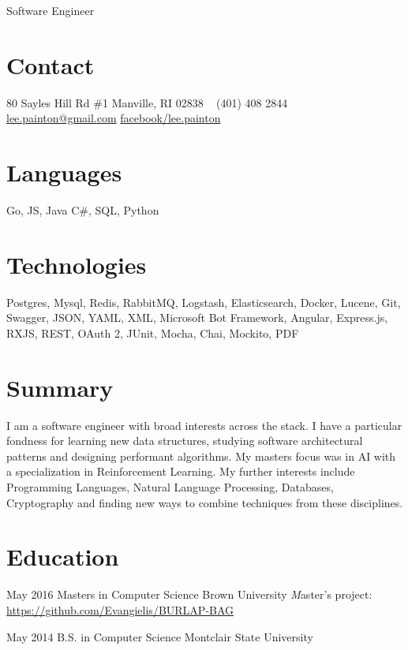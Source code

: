 \documentclass[]{friggeri-cv}
\begin{document}
       {Software Engineer}


\begin{aside} %
\section{\color{brown}Con\color{black}tact}
80 Sayles Hill Rd \#1
Manville, RI 02838
~
(401) 408 2844
~
\href{mailto:lee.painton@gmail.com}{lee.painton@gmail.com}
\href{https://www.facebook.com/lee.painton}{facebook/lee.painton}
\section{\color{violet}Lang\color{black}uages}
{\large Go, JS, Java}
{C\#, SQL, Python}
\section{\color{olive}Tech\color{black}nologies}
{Postgres, Mysql, Redis, RabbitMQ, Logstash, Elasticsearch, Docker, Lucene, Git, Swagger, JSON, YAML, XML, Microsoft Bot Framework, Angular, Express.js, RXJS, REST, OAuth 2, JUnit, Mocha, Chai, Mockito, PDF} 
\end{aside}

\section{Summary}

I am a software engineer with broad interests across the stack.  I have a particular fondness for learning new data structures, studying software architectural patterns and designing performant algorithms.  My masters focus was in AI with a specialization in Reinforcement Learning.  My further interests include Programming Languages, Natural Language Processing, Databases, Cryptography and finding new ways to combine techniques from these disciplines.

\section{Education}

\begin{entrylist}

\entry
{May 2016}
{Masters {\normalfont in Computer Science}}
{Brown University}
{\emph Master's project: \href{https://github.com/Evangielis/BURLAP-BAG}{https://github.com/Evangielis/BURLAP-BAG}}

\entry
{May 2014}
{B.S. {\normalfont in Computer Science}}
{Montclair State University}

\end{entrylist}
\end{document}
